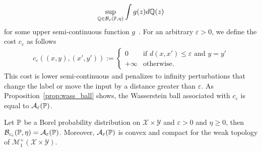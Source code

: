 \begin{align*}
    \sup_{\mathbb{Q}\in\mathcal{B}_{c}(\mathbb{P},\eta)}\int g(z)d\mathbb{Q}(z)
\end{align*} for some upper semi-continuous function $g$~\citep{yue2020linear}. %
For an arbitrary $\varepsilon>0$, we define the cost $c_\varepsilon$ as follows
\begin{align*}
c_\varepsilon((x,y),(x',y')) := \left\{
    \begin{array}{ll}
        0 & \mbox{if } d(x,x')\leq\varepsilon\mbox{ and }y = y'\\
        +\infty & \mbox{otherwise.}
    \end{array}
\right.
\end{align*}
This cost is lower semi-continuous and penalizes to infinity perturbations that change the label or move the input by a distance greater than $\varepsilon$. As Proposition~\ref{prop:wass_ball} shows, the Wasserstein ball associated with $c_\varepsilon$ is equal to $\mathcal{A}_{\varepsilon}(\mathbb{P})$.
\begin{prop}
\label{prop:wass_ball}
Let $\mathbb{P}$ be a Borel probability distribution on $\mathcal{X}\times\mathcal{Y}$ and $\varepsilon>0$ and $\eta\geq 0$, then
    $\mathcal{B}_{c_\varepsilon}(\mathbb{P},\eta) =\mathcal{A}_{\varepsilon}(\mathbb{P})$.
Moreover, $\mathcal{A}_{\varepsilon}(\mathbb{P})$ is convex and compact for the weak topology of $\mathcal{M}^+_1(\mathcal{X}\times\mathcal{Y})$.
\end{prop}
